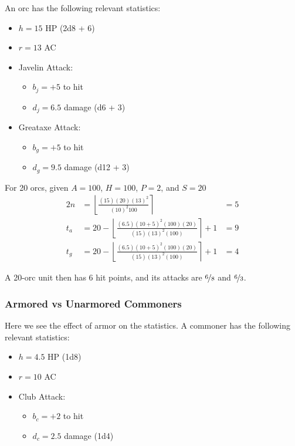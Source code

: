 An orc has the following relevant statistics:
\begin{itemize}
    \item $h = 15$ HP (2d8 + 6)
    \item $r = 13$ AC
    \item Javelin Attack:
        \begin{itemize}
            \item $b_j = +5$ to hit
            \item $d_j = 6.5$ damage (d6 + 3)
        \end{itemize}
    \item Greataxe Attack:
        \begin{itemize}
            \item $b_g = +5$ to hit
            \item $d_g = 9.5$ damage (d12 + 3)
        \end{itemize}
\end{itemize}

For 20 orcs, given $A = 100$, $H = 100$, $P = 2$, and $S = 20$
\begin{alignat*}{2}
    n   &=
        \left\lfloor
            \frac
                {(15) (20) (13)^2}
                {(10)^2 100}
        \right\rceil
            &=  5
    \\
    t_a &=
        20 -
        \left\lfloor
            \frac
                {(6.5) (10 + 5)^2 (100) (20)}
                {(15) (13)^2 (100)}
        \right\rceil
        + 1
            &=   9
    \\
    t_g &=
        20 -
        \left\lfloor
            \frac
                {(6.5) (10 + 5)^2 (100) (20)}
                {(15) (13)^2 (100)}
        \right\rceil
        + 1
            &=  4
\end{alignat*}

A 20-orc unit then has 6 hit points, and its attacks are
$\nicefrac{6}{8}$ and $\nicefrac{6}{3}$.

\subsubsection{Armored vs Unarmored Commoners}

Here we see the effect of armor on the statistics.
A commoner has the following relevant statistics:

\begin{itemize}
    \item $h = 4.5$ HP (1d8)
    \item $r = 10$ AC
    \item Club Attack:
        \begin{itemize}
            \item $b_c = +2$ to hit
            \item $d_c = 2.5$ damage (1d4)
        \end{itemize}
\end{itemize}


